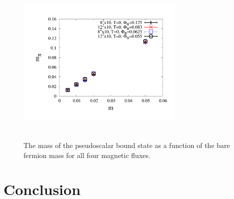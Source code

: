 \documentclass[aps,prd,twocolumn,showpacs,superscriptaddress,groupedaddress]{revtex4}  %
\begin{document}


\begin{figure}
  \includegraphics[height=8cm,width=8cm]{ps_mt_vs_m_2exp_graphene_paper.pdf} \hspace{-1cm}
\caption{The mass of the pseudoscalar bound state as a function of the bare fermion mass for all four magnetic fluxes.}
\label{MPSvsm}
\end{figure}

\section{\label{sec:Conclusion}Conclusion}
\end{document}
